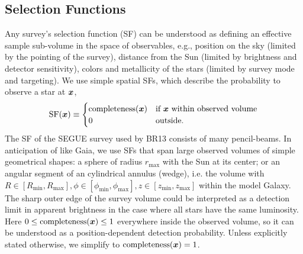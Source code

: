 \subsection{Selection Functions} \label{sec:selectionfunction}

Any survey's selection function (SF) can be understood as defining an effective sample sub-volume in the space of observables, e.g., position on the sky (limited by the pointing of the survey), distance from the Sun (limited by brightness and detector sensitivity), colors and metallicity of the stars (limited by survey mode and targeting). We use simple spatial SFs, which describe the probability to observe a star at $\boldsymbol{x}$,
\begin{eqnarray*}
\text{SF}(\boldsymbol{x}) \equiv \begin{cases}
\text{completeness}(\boldsymbol{x}) &\text{if $\boldsymbol{x}$ within observed volume}\\
0 & \text{outside.}
\end{cases}
\end{eqnarray*}
The SF of the SEGUE survey  used by BR13 consists of many pencil-beams. In anticipation of  like Gaia, we use SFs that span large observed volumes of simple geometrical shapes: a sphere of radius $r_\text{max}$ with the Sun at its center; or an angular segment of an cylindrical annulus (wedge), i.e. the volume with $R \in [R_\text{min},R_\text{max}],\phi \in [\phi_\text{min},\phi_\text{max}],z \in [z_\text{min},z_\text{max}]$ within the model Galaxy. The sharp outer edge of the survey volume could be interpreted as a detection limit in apparent brightness in the case where all stars have the same luminosity. Here $0 \leq \text{completeness}(\boldsymbol{x}) \leq 1$ everywhere inside the observed volume, so it can be understood as a position-dependent detection probability. Unless explicitly stated otherwise, we simplify to $\text{completeness}(\boldsymbol{x}) = 1$.
